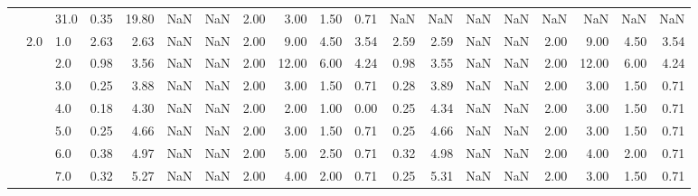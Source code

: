 \begin{tabular}{lllrrrrrrrrrrrrrrrr}
       &     & 31.0 &      0.35 &      19.80 &               NaN &                NaN & 2.00 &   3.00 &             1.50 &                         0.71 &       NaN &        NaN &               NaN &                NaN &  NaN &    NaN &              NaN &                          NaN \\
       & 2.0 & 1.0  &      2.63 &       2.63 &               NaN &                NaN & 2.00 &   9.00 &             4.50 &                         3.54 &      2.59 &       2.59 &               NaN &                NaN & 2.00 &   9.00 &             4.50 &                         3.54 \\
       &     & 2.0  &      0.98 &       3.56 &               NaN &                NaN & 2.00 &  12.00 &             6.00 &                         4.24 &      0.98 &       3.55 &               NaN &                NaN & 2.00 &  12.00 &             6.00 &                         4.24 \\
       &     & 3.0  &      0.25 &       3.88 &               NaN &                NaN & 2.00 &   3.00 &             1.50 &                         0.71 &      0.28 &       3.89 &               NaN &                NaN & 2.00 &   3.00 &             1.50 &                         0.71 \\
       &     & 4.0  &      0.18 &       4.30 &               NaN &                NaN & 2.00 &   2.00 &             1.00 &                         0.00 &      0.25 &       4.34 &               NaN &                NaN & 2.00 &   3.00 &             1.50 &                         0.71 \\
       &     & 5.0  &      0.25 &       4.66 &               NaN &                NaN & 2.00 &   3.00 &             1.50 &                         0.71 &      0.25 &       4.66 &               NaN &                NaN & 2.00 &   3.00 &             1.50 &                         0.71 \\
       &     & 6.0  &      0.38 &       4.97 &               NaN &                NaN & 2.00 &   5.00 &             2.50 &                         0.71 &      0.32 &       4.98 &               NaN &                NaN & 2.00 &   4.00 &             2.00 &                         0.71 \\
       &     & 7.0  &      0.32 &       5.27 &               NaN &                NaN & 2.00 &   4.00 &             2.00 &                         0.71 &      0.25 &       5.31 &               NaN &                NaN & 2.00 &   3.00 &             1.50 &                         0.71 \\

\end{tabular}
